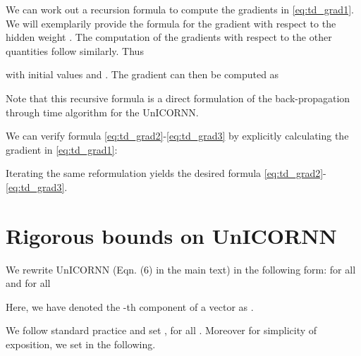 \documentclass{article}
\begin{document}
We can work out a recursion formula to compute the gradients in \eqref{eq:td_grad1}. We will exemplarily provide the formula for the gradient with respect to the hidden weight . The computation of the gradients with respect to the other quantities follow similarly. 
Thus

with initial values  and .
The gradient can then be computed as

Note that this recursive formula is a direct formulation of the back-propagation through time algorithm \citep{bptt} for the UnICORNN. 

We can verify formula \eqref{eq:td_grad2}-\eqref{eq:td_grad3} by explicitly calculating the gradient in \eqref{eq:td_grad1}:


Iterating the same reformulation yields the desired formula \eqref{eq:td_grad2}-\eqref{eq:td_grad3}.






\section{Rigorous bounds on UnICORNN}
We rewrite UnICORNN (Eqn. (6) in the main text) in the following form: for all  and for all 

Here, we have denoted the -th component of a vector  as .

We follow standard practice and set , for all . Moreover for simplicity of exposition, we set  in the following. 
\end{document}
